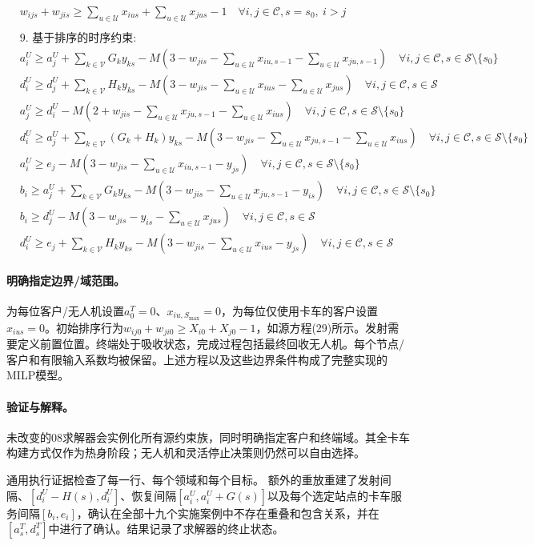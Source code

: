 \documentclass[11pt]{article}
\begin{document}
\[\begin{aligned}
&w_{ijs} + w_{jis} \ge \sum_{u \in \mathcal{U}} x_{ius} + \sum_{u \in \mathcal{U}} x_{jus}-1 \quad \forall i, j \in \mathcal{C}, s=s_0,\ i > j \\
\\
&\text{9. 基于排序的时序约束:} \\
&a^U_i \ge a^U_j + \sum_{k \in \mathcal{V}} G_k y_{ks} - M\left(3 - w_{jis} - \sum_{u \in \mathcal{U}} x_{iu,s-1} - \sum_{u \in \mathcal{U}} x_{ju,s-1}\right) \quad \forall i, j \in \mathcal{C}, s \in \mathcal{S} \setminus \{s_0\} \\
&d^U_i \ge d^U_j + \sum_{k \in \mathcal{V}} H_k y_{ks} - M\left(3 - w_{jis} - \sum_{u \in \mathcal{U}} x_{ius} - \sum_{u \in \mathcal{U}} x_{jus}\right) \quad \forall i, j \in \mathcal{C}, s \in \mathcal{S} \\
&a^U_j \ge d^U_i - M\left(2 + w_{jis} - \sum_{u \in \mathcal{U}} x_{ju,s-1} - \sum_{u \in \mathcal{U}} x_{ius}\right) \quad \forall i, j \in \mathcal{C}, s \in \mathcal{S} \setminus \{s_0\} \\
&d^U_i \ge a^U_j + \sum_{k \in \mathcal{V}} (G_k + H_k) y_{ks} - M\left(3 - w_{jis} - \sum_{u \in \mathcal{U}} x_{ju,s-1} - \sum_{u \in \mathcal{U}} x_{ius}\right) \quad \forall i, j \in \mathcal{C}, s \in \mathcal{S} \setminus \{s_0\} \\
&a^U_i \ge e_j - M\left(3 - w_{jis} - \sum_{u \in \mathcal{U}} x_{iu,s-1} - y_{js}\right) \quad \forall i, j \in \mathcal{C}, s \in \mathcal{S} \setminus \{s_0\} \\
&b_i \ge a^U_j + \sum_{k \in \mathcal{V}} G_k y_{ks} - M\left(3 - w_{jis} - \sum_{u \in \mathcal{U}} x_{ju,s-1} - y_{is}\right) \quad \forall i, j \in \mathcal{C}, s \in \mathcal{S} \setminus \{s_0\} \\
&b_i \ge d^U_j - M\left(3 - w_{jis} - y_{is} - \sum_{u \in \mathcal{U}} x_{jus}\right) \quad \forall i, j \in \mathcal{C}, s \in \mathcal{S} \\
&d^U_i \ge e_j + \sum_{k \in \mathcal{V}} H_k y_{ks} - M\left(3 - w_{jis} - \sum_{u \in \mathcal{U}} x_{ius} - y_{js}\right) \quad \forall i, j \in \mathcal{C}, s \in \mathcal{S}
\end{aligned}\]


\paragraph{明确指定边界/域范围。}
为每位客户/无人机设置$a^T_0=0$、$x_{iu,S_{\max}}=0$，为每位仅使用卡车的客户设置$x_{ius}=0$。初始排序行为$w_{ij0}+w_{ji0}\ge X_{i0}+X_{j0}-1$，如源方程(29)所示。发射需要定义前置位置。终端处于吸收状态，完成过程包括最终回收无人机。每个节点/客户和有限输入系数均被保留。上述方程以及这些边界条件构成了完整实现的MILP模型。

\paragraph{验证与解释。}
未改变的08求解器会实例化所有源约束族，同时明确指定客户和终端域。其全卡车构建方式仅作为热身阶段；无人机和灵活停止决策则仍然可以自由选择。

通用执行证据检查了每一行、每个领域和每个目标。  
额外的重放重建了发射间隔、$[d_i^U-H(s),d_i^U]$、恢复间隔$[a_i^U,a_i^U+G(s)]$以及每个选定站点的卡车服务间隔$[b_i,e_i]$，确认在全部十九个实施案例中不存在重叠和包含关系，并在$[a_s^T,d_s^T]$中进行了确认。结果记录了求解器的终止状态。
\end{document}
